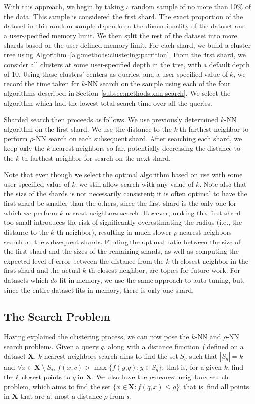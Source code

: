 With this approach, we begin by taking a random sample of no more than 10\% of the data.
This sample is considered the first shard.
The exact proportion of the dataset in this random sample depends on the dimensionality of the dataset and a user-specified memory limit. 
We then split the rest of the dataset into more shards based on the user-defined memory limit.
For each shard, we build a cluster tree using Algorithm~\ref{alg:methods:clustering:partition}.
From the first shard, we consider all clusters at some user-specified depth in the tree, with a default depth of 10.
Using these clusters' centers as queries, and a user-specified value of $k$, we record the time taken for $k$-NN search on the sample using each of the four algorithms described in Section~\ref{subsec:methods:knn-search}.
We select the algorithm which had the lowest total search time over all the queries. 

Sharded search then proceeds as follows.
We use previously determined $k$-NN algorithm on the first shard. 
We use the distance to the $k$-th farthest neighbor to perform $\rho$-NN search on each subsequent shard. 
After searching each shard, we keep only the $k$-nearest neighbors so far, potentially decreasing the distance to the $k$-th farthest neighbor for search on the next shard.

Note that even though we select the optimal algorithm based on use with some user-specified value of $k$, we still allow search with any value of $k$.
Note also that the size of the shards is not necessarily consistent;
it is often optimal to have the first shard be smaller than the others, since the first shard is the only one for which we perform $k$-nearest neighbors search. 
However, making this first shard too small introduces the risk of significantly overestimating the radius (i.e., the distance to the $k$-th neighbor), resulting in much slower $\rho$-nearest neighbors search on the subsequent shards.
Finding the optimal ratio between the size of the first shard and the sizes of the remaining shards, as well as computing the expected level of error between the distance from the $k$-th closest neighbor in the first shard and the actual $k$-th closest neighbor, are topics for future work.
For datasets which \emph{do} fit in memory, we use the same approach to auto-tuning, but, since the entire dataset fits in memory, there is only one shard. 


\subsection{The Search Problem}
\label{subsec:methods:the-search-problem}
Having explained the clustering process, we can now pose the $k$-NN and $\rho$-NN search problems.
Given a query $q$, along with a distance function $f$ defined on a dataset $\textbf{X}$, $k$-nearest neighbors search aims to find 
the set $S_q$ such that  $|S_q| = k$ and $\forall x \in \textbf{X} \ \setminus \ S_q$, $f(x, q) > \max\{f(y, q): y \in S_q \}$;
that is, for a given $k$, find the $k$ closest points to $q$ in $ \textbf{X}$.
We also have the $\rho$-nearest neighbors search problem, which aims to find the set $\{x \in \textbf{X}: f(q, x) \leq \rho \}$;
that is, find all points in $\textbf{X}$ that are at most a distance $\rho$ from $q$.

